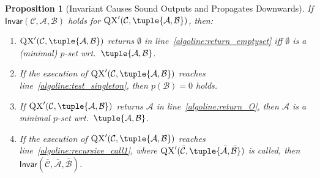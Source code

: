 \documentclass[]{elsarticle}
\newcommand{\scQX}{{\textsc{QX}}}
\newcommand{\ma}{\mathcal{A}}
\newcommand{\mb}{\mathcal{B}}
\newcommand{\mc}{\mathcal{C}}
\newcommand{\ba}{\bar{\ma}}
\newcommand{\bb}{\bar{\mb}}
\newcommand{\bc}{\bar{\mc}}
\newcommand{\Inv}{\mathsf{Invar}}
\newtheorem{proposition}{Proposition}[]{}
\begin{document}
	\begin{proposition}[Invariant Causes Sound Outputs and Propagates Downwards]\label{prop:correctness_of_QX'_if_invar_and_propagation_of_invar}
		If $\Inv(\mc,\ma,\mb)$ holds for $\scQX'(\mc,\tuple{\ma,\mb})$, then:
		\begin{enumerate}[noitemsep,label=(\arabic*)]
			\item \label{prop:correctness_of_QX'_if_invar_and_propagation_of_invar:enum:return_line10_correct} $\scQX'(\mc,\tuple{\ma,\mb})$ returns $\emptyset$ in line~\ref{algoline:return_emptyset} iff $\emptyset$ is a (minimal) $p$-set wrt.\ $\tuple{\ma,\mb}$.
			\item \label{prop:correctness_of_QX'_if_invar_and_propagation_of_invar:enum:p(b)=0_after_line10} If the execution of $\scQX'(\mc,\tuple{\ma,\mb})$ reaches line~\ref{algoline:test_singleton}, then $p(\mb)=0$ holds.
			\item \label{prop:correctness_of_QX'_if_invar_and_propagation_of_invar:enum:return_line12_correct} If $\scQX'(\mc,\tuple{\ma,\mb})$ returns $\ma$ in line~\ref{algoline:return_O}, then $\ma$ is a minimal $p$-set wrt.\ $\tuple{\ma,\mb}$.
			\item 
			\label{prop:correctness_of_QX'_if_invar_and_propagation_of_invar:enum:propagation_of_invar_to_recursive_call} If the execution of $\scQX'(\mc,\tuple{\ma,\mb})$ reaches line~\ref{algoline:recursive_call1}, where $\scQX'(\bc,\tuple{\ba,\bb})$
			is called, then $\Inv(\bc,\ba,\bb)$.
		\end{enumerate}
	\end{proposition}
\end{document}
